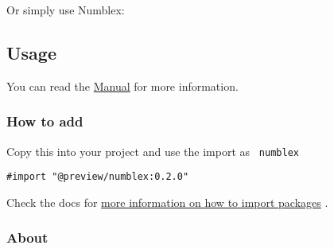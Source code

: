Or simply use Numblex:

\begin{Shaded}
\begin{Highlighting}[]

\end{Highlighting}
\end{Shaded}

\subsection{Usage}\label{usage}

\begin{Shaded}
\begin{Highlighting}[]

\end{Highlighting}
\end{Shaded}

You can read the
\href{https://github.com/ParaN3xus/numblex/blob/main/manual.pdf}{Manual}
for more information.

\subsubsection{How to add}\label{how-to-add}

Copy this into your project and use the import as \texttt{\ numblex\ }

\begin{verbatim}
#import "@preview/numblex:0.2.0"
\end{verbatim}



Check the docs for
\href{https://typst.app/docs/reference/scripting/\#packages}{more
information on how to import packages} .

\subsubsection{About}\label{about}

